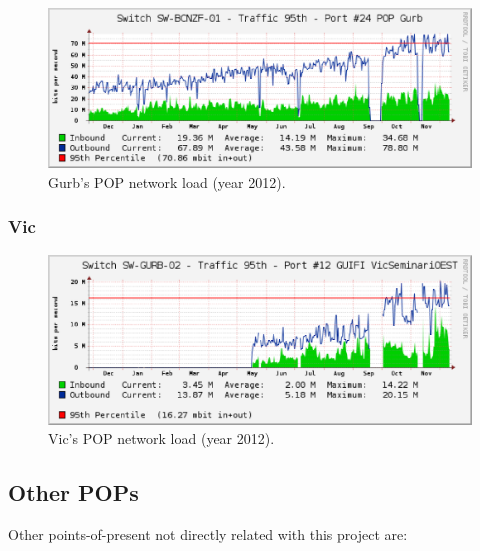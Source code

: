 \begin{figure}[htbp]
  \centering
  \includegraphics[scale=.65]{sect3/figures/gurb_network_load_year.eps} 
  \caption{Gurb's POP network load (year 2012).}
  \label{fig:gurb_net_load}
\end{figure}



\FloatBarrier
\subsubsection{Vic}



\begin{figure}[htbp]
  \centering
  \includegraphics[scale=.65]{sect3/figures/vic_network_load_year.eps} 
  \caption{Vic's POP network load (year 2012).}
  \label{fig:vic_net_load}
\end{figure}



\FloatBarrier
\subsection{Other POPs}

Other points-of-present not directly related with this project are:

